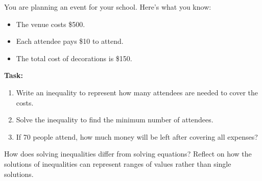 \documentclass[12pt]{article}
\begin{document}
\begin{tcolorbox}[colframe=black!60, colback=white, 
coltitle=black, colbacktitle=black!15, fonttitle=\bfseries\Large, 
title=Performance Task: Budgeting for an Event, halign title=center, left=10pt, right=10pt, top=10pt, bottom=90pt]
You are planning an event for your school. Here’s what you know:
\begin{itemize}
    \item The venue costs \$500.
    \item Each attendee pays \$10 to attend.
    \item The total cost of decorations is \$150.
\end{itemize}
\textbf{Task:}
\begin{enumerate}[itemsep=5em]
    \item Write an inequality to represent how many attendees are needed to cover the costs.
    \item Solve the inequality to find the minimum number of attendees.
    \item If 70 people attend, how much money will be left after covering all expenses?
\end{enumerate}
\end{tcolorbox}

\vspace{1em}

\begin{tcolorbox}[colframe=black!60, colback=white, 
coltitle=black, colbacktitle=black!15, fonttitle=\bfseries\Large, 
title=Reflection, halign title=center, left=10pt, right=10pt, top=10pt, bottom=80pt]
How does solving inequalities differ from solving equations? Reflect on how the solutions of inequalities can represent ranges of values rather than single solutions.
\end{tcolorbox}
\end{document}
